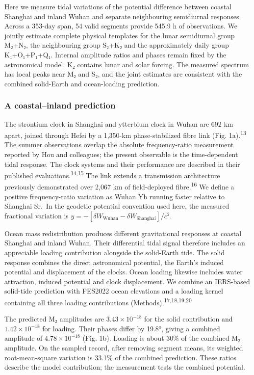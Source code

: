 \documentclass[
  10pt,
  a4paper,
]{article}
\begin{document}
Here we measure tidal variations of the potential difference between
coastal Shanghai and inland Wuhan and separate neighbouring semidiurnal
responses. Across a 353-day span, 54 valid segments provide 545.9 h of
observations. We jointly estimate complete physical templates for the
lunar semidiurnal group M₂+N₂, the neighbouring group S₂+K₂ and the
approximately daily group K₁+O₁+P₁+Q₁. Internal amplitude ratios and
phases remain fixed by the astronomical model. K₂ contains lunar and
solar forcing. The measured spectrum has local peaks near M₂ and S₂, and
the joint estimates are consistent with the combined solid-Earth and
ocean-loading prediction.

\hypertarget{a-coastalinland-prediction}{%
\subsubsection{A coastal--inland
prediction}\label{a-coastalinland-prediction}}

The strontium clock in Shanghai and ytterbium clock in Wuhan are 692 km
apart, joined through Hefei by a 1,350-km phase-stabilized fibre link
(Fig. 1a).\textsuperscript{13} The summer observations overlap the
absolute frequency-ratio measurement reported by Hou and colleagues; the
present observable is the time-dependent tidal response. The clock
systems and their performance are described in their published
evaluations.\textsuperscript{14,15} The link extends a transmission
architecture previously demonstrated over 2,067 km of field-deployed
fibre.\textsuperscript{16} We define a positive frequency-ratio
variation as Wuhan Yb running faster relative to Shanghai Sr.~In the
geodetic potential convention used here, the measured fractional
variation is
\(y=-[\delta W_{\mathrm{Wuhan}}-\delta W_{\mathrm{Shanghai}}]/c^2\).

Ocean mass redistribution produces different gravitational responses at
coastal Shanghai and inland Wuhan. Their differential tidal signal
therefore includes an appreciable loading contribution alongside the
solid-Earth tide. The solid response combines the direct astronomical
potential, the Earth's induced potential and displacement of the clocks.
Ocean loading likewise includes water attraction, induced potential and
clock displacement. We combine an IERS-based solid-tide prediction with
FES2022 ocean elevations and a loading kernel containing all three
loading contributions (Methods).\textsuperscript{17,18,19,20}

The predicted M₂ amplitudes are \(3.43\times10^{-18}\) for the solid
contribution and \(1.42\times10^{-18}\) for loading. Their phases differ
by 19.8°, giving a combined amplitude of \(4.78\times10^{-18}\) (Fig.
1b). Loading is about 30\% of the combined M₂ amplitude. On the sampled
record, after removing segment means, its weighted root-mean-square
variation is 33.1\% of the combined prediction. These ratios describe
the model contribution; the measurement tests the combined potential.
\end{document}
